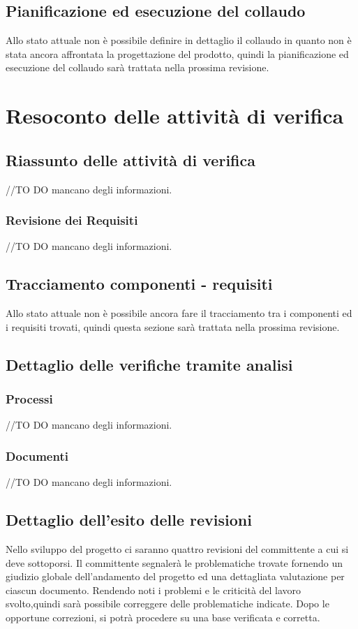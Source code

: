 \documentclass[12pt,a4paper]{article}
\begin{document}
\subsection{Pianificazione ed esecuzione del collaudo}
Allo stato attuale non è possibile definire in dettaglio il collaudo in quanto non è stata ancora affrontata la
progettazione del prodotto, quindi la pianificazione ed esecuzione del collaudo sarà trattata nella prossima revisione.

\newpage
\appendix
\section{ Resoconto delle attività di verifica} \label{Resoconto delle attività di verifica}
\subsection{Riassunto delle attività di verifica} 
//TO DO \IB mancano degli informazioni.
\subsubsection{Revisione dei Requisiti}
//TO DO \IB mancano degli informazioni.
\subsection{Tracciamento componenti - requisiti}
Allo stato attuale non è possibile ancora fare il tracciamento tra i componenti ed i requisiti trovati, quindi questa sezione sarà trattata nella prossima revisione.
\subsection{Dettaglio delle verifiche tramite analisi}
\subsubsection{Processi}
//TO DO \IB mancano degli informazioni.
\subsubsection{Documenti}
//TO DO \IB mancano degli informazioni.
\subsection{Dettaglio dell'esito delle revisioni}
Nello sviluppo del progetto ci saranno quattro revisioni del committente a cui si deve sottoporsi. Il committente segnalerà le problematiche trovate fornendo un giudizio globale dell'andamento del progetto ed una dettagliata valutazione per ciascun documento. Rendendo noti i problemi e le criticità del lavoro svolto,quindi sarà possibile correggere delle problematiche indicate. Dopo le opportune correzioni, si potrà procedere su una base verificata e corretta.

\newpage
\printglossary[title={Glossario}]
\end{document}
